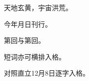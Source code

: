 \documentclass{ltc-cn-vbook}
\begin{document}
\begin{正文}
天地玄黄，宇宙洪荒。

今年月日刊行。

第回与第回。

短词亦可横排入格。

对照直立12月8日逐字入格。
\end{正文}
\end{document}
